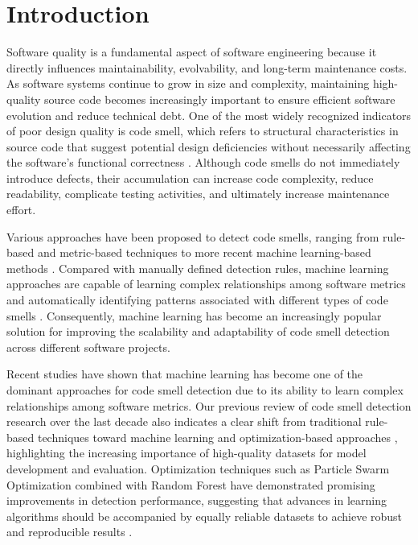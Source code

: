 \documentclass[]{einformatica}
\begin{document}
	\maketitle 
 

\section{Introduction}\label{sec:Introduction}

Software quality is a fundamental aspect of software engineering because it directly influences maintainability, evolvability, and long-term maintenance costs. As software systems continue to grow in size and complexity, maintaining high-quality source code becomes increasingly important to ensure efficient software evolution and reduce technical debt. One of the most widely recognized indicators of poor design quality is code smell, which refers to structural characteristics in source code that suggest potential design deficiencies without necessarily affecting the software's functional correctness \cite{Fowler1999}\cite{Palomba2018}. Although code smells do not immediately introduce defects, their accumulation can increase code complexity, reduce readability, complicate testing activities, and ultimately increase maintenance effort.

Various approaches have been proposed to detect code smells, ranging from rule-based and metric-based techniques to more recent machine learning-based methods \cite{Pereira_dos_Reis_2021}\cite{THAKUR2026112784}. Compared with manually defined detection rules, machine learning approaches are capable of learning complex relationships among software metrics and automatically identifying patterns associated with different types of code smells \cite{THAKUR2026112784}\cite{Alodibat2026}\cite{MESBAH2026108242}. Consequently, machine learning has become an increasingly popular solution for improving the scalability and adaptability of code smell detection across different software projects.

Recent studies have shown that machine learning has become one of the dominant approaches for code smell detection due to its ability to learn complex relationships among software metrics. Our previous review of code smell detection research over the last decade also indicates a clear shift from traditional rule-based techniques toward machine learning and optimization-based approaches \cite{WibowoICITEE2025}, highlighting the increasing importance of high-quality datasets for model development and evaluation. Optimization techniques such as Particle Swarm Optimization combined with Random Forest have demonstrated promising improvements in detection performance, suggesting that advances in learning algorithms should be accompanied by equally reliable datasets to achieve robust and reproducible results \cite{Madeyski2017}\cite{Wibowo2026}\cite{Bishop2026}\cite{Destefanis2026}.
\end{document}
